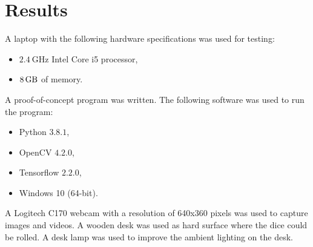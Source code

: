 \documentclass[conference]{IEEEtran}
\begin{document}
\section{Results}

A laptop with the following hardware specifications was used for testing:
\begin{itemize}
	\item $\SI{2.4}{\giga\hertz}$ Intel Core i5 processor,
	\item $\SI{8}{\giga\byte}$ of memory.
\end{itemize}

A proof-of-concept program was written.
The following software was used to run the program:
\begin{itemize}
	\item Python $3.8.1$,
	\item OpenCV $4.2.0$,
	\item Tensorflow $2.2.0$,
	\item Windows 10 (64-bit).
\end{itemize}

A Logitech C170 webcam with a resolution of 640x360 pixels was used to capture images and videos.
A wooden desk was used as hard surface where the dice could be rolled.
A desk lamp was used to improve the ambient lighting on the desk. 
\end{document}
